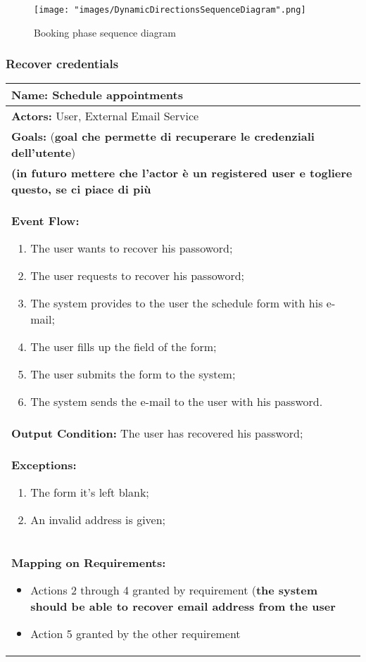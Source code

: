 \begin{figure}[H]
\begin{center}
\texttt{[image: "images/DynamicDirectionsSequenceDiagram".png]}
\caption{Booking phase sequence diagram}
\end{center}
\end{figure}


\subsubsection{Recover credentials}\label{usecase:recovercredentials}
\begin{longtable}{|p{14cm}|} \hline
\textbf{Name:} Schedule appointments \\ \hline
\textbf{Actors:} User, External Email Service \\ \hline
\textbf{Goals:} (\textbf{goal che permette di recuperare le credenziali dell'utente})\\ \hline
\textbf{(\textbf{in futuro mettere che l'actor è un registered user e togliere questo, se ci piace di più}} \\ \hline

\textbf{Event Flow:}
\begin{enumerate}
\item The user wants to recover his passoword;
\item The user requests to recover his passoword;
\item The system provides to the user the schedule form with his e-mail;
\item The user fills up the field of the form;
\item The user submits the form to the system;
\item The system sends the e-mail to the user with his password.
\end{enumerate}
\\ \hline

\textbf{Output Condition:} The user has recovered his password; \\ \hline

\textbf{Exceptions:}
\begin{enumerate}
\item The form it's left blank;
\item An invalid address is given;
\end{enumerate} \\ \hline

\textbf{Mapping on Requirements:}
\begin{itemize}
\item Actions 2 through 4 granted by requirement (\textbf{the system should be able to recover email address from the user}
\item Action 5 granted by the other requirement
\end{itemize}  \\ \hline

\end{longtable}

